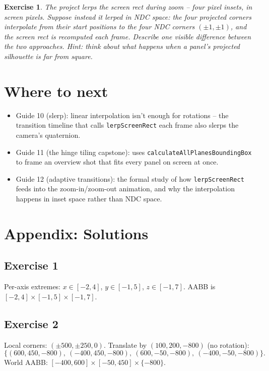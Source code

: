\documentclass{article}
\newtheorem{exercise}{Exercise}
\begin{document}
\begin{exercise}
The project lerps the screen rect during zoom -- four pixel insets, in screen pixels.
Suppose instead it lerped in NDC space: the four projected corners interpolate from
their start positions to the four NDC corners $(\pm 1, \pm 1)$, and the screen rect is
recomputed each frame. Describe one visible difference between the two approaches.
\emph{Hint:} think about what happens when a panel's projected silhouette is far from
square.
\end{exercise}

\section{Where to next}

\begin{itemize}
  \item Guide 10 (slerp): linear interpolation isn't enough for rotations -- the
    transition timeline that calls \texttt{lerpScreenRect} each frame also slerps the
    camera's quaternion.
  \item Guide 11 (the hinge tiling capstone): uses
    \texttt{calculateAllPlanesBoundingBox} to frame an overview shot that fits every
    panel on screen at once.
  \item Guide 12 (adaptive transitions): the formal study of how
    \texttt{lerpScreenRect} feeds into the zoom-in/zoom-out animation, and why the
    interpolation happens in inset space rather than NDC space.
\end{itemize}

\section{Appendix: Solutions}

\subsection*{Exercise 1}
Per-axis extremes: $x \in [-2, 4]$, $y \in [-1, 5]$, $z \in [-1, 7]$. AABB is
$[-2, 4] \times [-1, 5] \times [-1, 7]$.

\subsection*{Exercise 2}
Local corners: $(\pm 500, \pm 250, 0)$. Translate by $(100, 200, -800)$ (no rotation):
\[
  \{(600, 450, -800),\ (-400, 450, -800),\ (600, -50, -800),\ (-400, -50, -800)\}.
\]
World AABB: $[-400, 600] \times [-50, 450] \times \{-800\}$.
\end{document}
